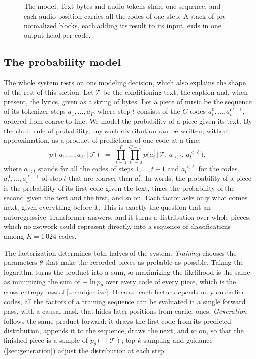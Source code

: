 \begin{figure}[htbp]
\centering

\caption{The model. Text bytes and audio tokens share one sequence, and each
audio position carries all the codes of one step. A stack of pre-normalized
blocks, each adding its result to its input, ends in one output head per
code.}
\label{fig:model}
\end{figure}

\subsection{The probability model}
\label{sec:probability}

The whole system rests on one modeling decision, which also explains the
shape of the rest of this section. Let $\mathcal{T}$ be the conditioning text,
the caption and, when present, the lyrics, given as a string of bytes. Let a
piece of music be the sequence of its tokenizer steps $a_1, \dots, a_F$, where
step $t$ consists of the $C$ codes $a_t^0, \dots, a_t^{C-1}$, ordered from coarse
to fine. We model the probability of a piece given its text. By the chain rule
of probability, any such distribution can be written, without approximation,
as a product of predictions of one code at a time:
\[
p(a_1, \dots, a_F \mid \mathcal{T}) \;=\; \prod_{t=1}^{F} \prod_{\ell=0}^{C-1}
p\big(a_t^{\ell} \,\big|\, \mathcal{T},\, a_{<t},\, a_t^{<\ell}\big),
\]
where $a_{<t}$ stands for all the codes of steps $1, \dots, t-1$ and
$a_t^{<\ell}$ for the codes $a_t^0, \dots, a_t^{\ell-1}$ of step $t$ that are
coarser than $a_t^\ell$. In words, the probability of a piece is the probability of its first code
given the text, times the probability of the second given the text and the
first, and so on. Each factor asks only what comes next, given everything
before it. This is exactly the question that an autoregressive Transformer
answers, and it turns a distribution over whole pieces, which no network could
represent directly, into a sequence of classifications among $K = 1\,024$ codes.

The factorization determines both halves of the system. \emph{Training}
chooses the parameters $\theta$ that make the recorded pieces as probable as
possible. Taking the logarithm turns the product into a sum, so maximizing the
likelihood is the same as minimizing the sum of $-\ln p_\theta$ over every
code of every piece, which is the cross-entropy loss of \cref{sec:objective}.
Because each factor depends only on earlier codes, all the factors of a
training sequence can be evaluated in a single forward pass, with a causal
mask that hides later positions from earlier ones. \emph{Generation} follows
the same product forward: it draws the first code from its predicted
distribution, appends it to the sequence, draws the next, and so on, so that
the finished piece is a sample of $p_\theta(\cdot \mid \mathcal{T})$; top-$k$
sampling and guidance (\cref{sec:generation}) adjust the distribution at each
step.

